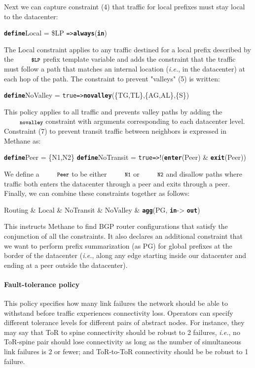 \documentclass[numbers, 10pt, preprint]{sigplanconf}
\newcommand{\IE}{\emph{i.e.}}
\newcommand{\sysname}{{\small \sf Methane}\xspace}
\newcommand{\para}[1]{\paragraph*{\textbf{#1}}}
\newcommand{\CD}[1]{\texttt{\small #1}}  %
\newcommand{\KW}[1]{\texttt{\small\bfseries{#1}}}
\newcommand{\True}{\CD{true}}
\newcommand{\Define}{\KW{define}}
\newcommand{\Path}{\texttt{=>}}
\newcommand{\Agg}{\KW{agg}}
\newcommand{\In}{\KW{in}}
\newcommand{\Out}{\KW{out}}
\newcommand{\Exit}{\KW{exit}}
\newcommand{\Enter}{\KW{enter}}
\newcommand{\Always}{\KW{always}}
\newcommand{\Novalley}{\KW{novalley}}
\begin{document}
Next we can capture constraint (4) that traffic for local prefixes must stay local to the datacenter:
%
\begin{code}
\Define Local =
    \$LP \Path \Always(\In)
\end{code}
\noindent%
%
The Local constraint applies to any traffic destined for a local prefix described by the $\CD{\$LP}$ prefix template variable and adds the constraint that the traffic must follow a path that matches an internal location (\IE, in the datacenter) at each hop of the path.
%
The constraint to prevent "valleys" (5) is written:
%
\begin{code}
\Define NoValley =
    \True \Path \Novalley(\{TG,TL\},\{AG,AL\},\{S\})
\end{code}
\noindent%
%
This policy applies to all traffic and prevents valley paths by adding the $\Novalley$ constraint with arguments corresponding to each datacenter level.
%
Constraint (7) to prevent transit traffic between neighbors is expressed in \sysname as:
%
\begin{code}
\Define Peer = \{N1,N2\}
\Define NoTransit =
    \True \Path !(\Enter(Peer) & \Exit(Peer))
\end{code}
\noindent%
%
We define a $\CD{Peer}$ to be either $\CD{N1}$ or $\CD{N2}$ and disallow paths where traffic both enters the datacenter through a peer and exits through a peer. Finally, we can combine these constraints together as follows:

\begin{code}
Routing & Local & NoTransit &
NoValley & \Agg(PG, \In -> \Out)
\end{code}
\noindent%

This instructs \sysname to find BGP router configurations that satisfy the conjunction of all the constraints. It also declares an additional constraint that we want to perform prefix summarization (as PG) for global prefixes at the border of the datacenter (\IE, along any edge starting inside our datacenter and ending at a peer outside the datacenter).

\para{Fault-tolerance policy} This policy specifies how many link failures the network should be able to withstand before traffic experiences connectivity loss. Operators can specify different tolerance levels for different pairs of abstract nodes. For instance, they may say that ToR to spine connectivity should be robust to 2 failures, \IE, no ToR-spine pair should lose connectivity as long as the number of simultaneous link failures is 2 or fewer; and ToR-to-ToR connectivity should be be robust to 1 failure.
\end{document}
